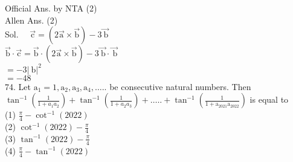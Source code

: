 \documentclass[10pt]{article}
\begin{document}
Official Ans. by NTA (2)\\
Allen Ans. (2)\\
Sol. \(\quad \overrightarrow{\mathrm{c}}=(2 \overrightarrow{\mathrm{a}} \times \overrightarrow{\mathrm{b}})-3 \overrightarrow{\mathrm{~b}}\)\\
\(\overrightarrow{\mathrm{b}} \cdot \overrightarrow{\mathrm{c}}=\overrightarrow{\mathrm{b}} \cdot(2 \overrightarrow{\mathrm{a}} \times \overrightarrow{\mathrm{b}})-3 \overrightarrow{\mathrm{~b}} \cdot \overrightarrow{\mathrm{~b}}\)\\
\(=-3|\mathrm{~b}|^{2}\)\\
\(=-48\)\\
74. Let \(\mathrm{a}_{1}=1, \mathrm{a}_{2}, \mathrm{a}_{3}, \mathrm{a}_{4}, \ldots .\). be consecutive natural numbers. Then \(\tan ^{-1}\left(\frac{1}{1+a_{1} a_{2}}\right)+\tan ^{-1}\left(\frac{1}{1+a_{2} a_{3}}\right) +\ldots . .+\tan ^{-1}\left(\frac{1}{1+\mathrm{a}_{2021} \mathrm{a}_{2022}}\right)\) is equal to\\
(1) \(\frac{\pi}{4}-\cot ^{-1}(2022)\)\\
(2) \(\cot ^{-1}(2022)-\frac{\pi}{4}\)\\
(3) \(\tan ^{-1}(2022)-\frac{\pi}{4}\)\\
(4) \(\frac{\pi}{4}-\tan ^{-1}(2022)\)
\end{document}

